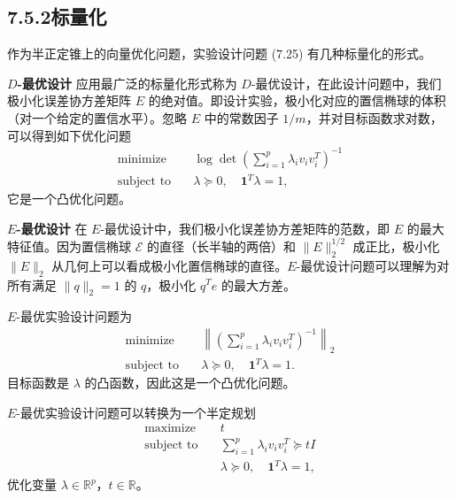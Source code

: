 \documentclass[UTF8,12pt,a4paper,fontset=fandol]{ctexart}
\begin{document}
\subsection*{7.5.2\quad 标量化}

作为半正定锥上的向量优化问题，实验设计问题 (7.25) 有几种标量化的形式。

\noindent\textbf{$D$-最优设计}\quad
应用最广泛的标量化形式称为 $D$-最优设计，在此设计问题中，我们极小化误差协方差矩阵 $E$ 的绝对值。即设计实验，极小化对应的置信椭球的体积（对一个给定的置信水平）。忽略 $E$ 中的常数因子 $1/m$，并对目标函数求对数，可以得到如下优化问题
\begin{equation}
\begin{aligned}
\text{minimize}\quad & \log\det\left(\sum_{i=1}^p\lambda_iv_iv_i^T\right)^{-1}\\
\text{subject to}\quad & \lambda\succeq 0,\quad \mathbf{1}^T\lambda=1,
\end{aligned}
\tag{7.26}
\end{equation}
它是一个凸优化问题。

\noindent\textbf{$E$-最优设计}\quad
在 $E$-最优设计中，我们极小化误差协方差矩阵的范数，即 $E$ 的最大特征值。因为置信椭球 $\mathcal{E}$ 的直径（长半轴的两倍）和 $\|E\|_2^{1/2}$ 成正比，极小化 $\|E\|_2$ 从几何上可以看成极小化置信椭球的直径。$E$-最优设计问题可以理解为对所有满足 $\|q\|_2=1$ 的 $q$，极小化 $q^Te$ 的最大方差。

$E$-最优实验设计问题为
\[
\begin{aligned}
\text{minimize}\quad & \left\|\left(\sum_{i=1}^p\lambda_iv_iv_i^T\right)^{-1}\right\|_2\\
\text{subject to}\quad & \lambda\succeq 0,\quad \mathbf{1}^T\lambda=1.
\end{aligned}
\]
目标函数是 $\lambda$ 的凸函数，因此这是一个凸优化问题。

$E$-最优实验设计问题可以转换为一个半定规划
\begin{equation}
\begin{aligned}
\text{maximize}\quad & t\\
\text{subject to}\quad & \sum_{i=1}^p\lambda_iv_iv_i^T\succeq tI\\
& \lambda\succeq 0,\quad \mathbf{1}^T\lambda=1,
\end{aligned}
\tag{7.27}
\end{equation}
优化变量 $\lambda\in\mathbb{R}^p$，$t\in\mathbb{R}$。
\end{document}
